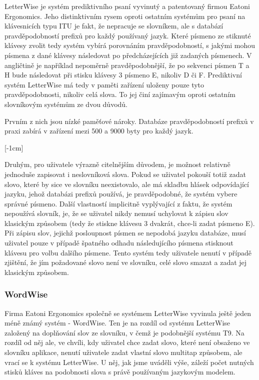 \documentclass{article}
\begin{document}
LetterWise je systém prediktivního psaní vyvinutý a patentovaný firmou Eatoni Ergonomics. Jeho distinktivním rysem oproti ostatním systémům pro psaní na klávesnicích typu ITU je fakt, že nepracuje se slovníkem, ale s databází pravděpodobností prefixů pro každý používaný jazyk. Které písmeno ze stiknuté klávesy zvolit tedy systém vybírá porovnáním pravděpodobností, s jakými mohou písmena z dané klávesy následovat po předcházejících již zadaných písmenech. V angličtině je například nepoměrně pravděpodobnější, že po sekvenci písmen T a H bude následovat při stisku klávesy 3 písmeno E, nikoliv D či F. Prediktivní systém LetterWise má tedy v paměti zařízení uloženy pouze tyto pravděpodobnosti, nikoliv celá slova. \cite{MacKenzie2001} To jej činí zajímavým oproti ostatním slovníkovým systémům ze dvou důvodů.

Prvním z nich jsou nízké paměťové nároky. Databáze pravděpodobností prefixů v praxi zabírá v zařízení mezi 500 a 9000 byty pro každý jazyk.

[-1cm]

Druhým, pro uživatele výrazně citelnějším důvodem, je možnost relativně jednoduše zapisovat i neslovníková slova. Pokud se uživatel pokouší totiž zadat slovo, které by sice ve slovníku neexistovalo, ale má skladbu hlásek odpovídající jazyku, jehož databázi prefixů používá, je pravděpodobné, že systém vybere správné písmeno. Další vlastností implicitně vyplývající z faktu, že systém nepoužívá slovník, je, že se uživatel nikdy nemusí uchylovat k zápisu slov klasickým způsobem (tedy že stiskne klávesu 3 dvakrát, chce-li zadat písmeno E). Při zápisu slov, jejichž posloupnost písmen se nepodobá jazyku databáze, musí uživatel pouze v případě špatného odhadu následujícího písmena stisknout klávesu pro volbu dalšího písmene. Tento systém tedy uživatele nenutí v případě zjištění, že jím požadované slovo není ve slovníku, celé slovo smazat a zadat jej klasickým způsobem. \cite{MacKenzie2001} \cite{Ghayoomi2009}

\subsubsection{WordWise}

Firma Eatoni Ergonomics společně se systémem LetterWise vyvinula ještě jeden méně známý systém - WordWise. Ten je na rozdíl od systému LetterWise založený na doplňování slov ze slovníku, v čemž je podobnější systému T9. Na rozdíl od něj ale, ve chvíli, kdy uživatel chce zadat slovo, které není obsaženo ve slovníku aplikace, nenutí uživatele zadat vlastní slovo multitap způsobem, ale vrací se k systému LetterWise. U něj, jak jsme uváděli výše, záleží počet nutných stisků kláves na podobnosti slova s právě používaným jazykovým modelem. 
\end{document}
